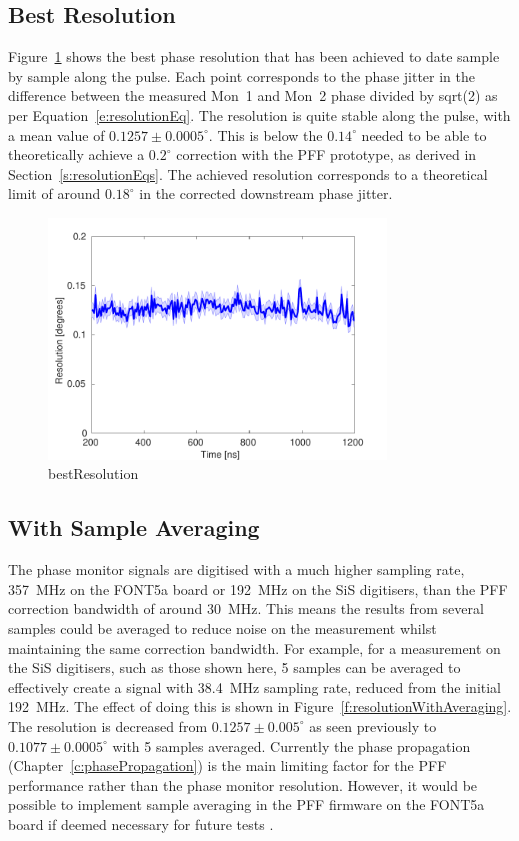 \subsection{Best Resolution}
\label{ss:bestRes}

Figure~\ref{f:bestResolution} shows the best phase resolution that has been achieved to date sample by sample along the pulse. Each point corresponds to the phase jitter in the difference between the measured Mon~1 and Mon~2 phase divided by sqrt(2) as per Equation~\ref{e:resolutionEq}.  The resolution is quite stable along the pulse, with a mean value of \(0.1257\pm0.0005^\circ\). This is below the \(0.14^\circ\) needed to be able to theoretically achieve a \(0.2^\circ\) correction with the PFF prototype, as derived in Section~\ref{s:resolutionEqs}. The achieved resolution corresponds to a theoretical limit of around \(0.18^\circ\) in the corrected downstream phase jitter.

\begin{figure}
  \centering
  \includegraphics[width=0.8\textwidth]{Figures/phaseMons/bestResolution}
  \caption{bestResolution}
  \label{f:bestResolution}
\end{figure}

\subsection{With Sample Averaging}
\label{ss:resCalAlongPulse}

The phase monitor signals are digitised with a much higher sampling rate, 357~MHz on the FONT5a board or 192~MHz on the SiS digitisers, than the PFF correction bandwidth of around 30~MHz. This means the results from several samples could be averaged to reduce noise on the measurement whilst maintaining the same correction bandwidth. For example, for a measurement on the SiS digitisers, such as those shown here, 5 samples can be averaged to effectively create a signal with 38.4~MHz sampling rate, reduced from the initial 192~MHz. The effect of doing this is shown in Figure~\ref{f:resolutionWithAveraging}. The resolution is decreased from \(0.1257\pm0.005^\circ\) as seen previously to \(0.1077\pm0.0005^\circ\) with 5 samples averaged. Currently the phase propagation (Chapter~\ref{c:phasePropagation}) is the main limiting factor for the PFF performance rather than the phase monitor resolution. However, it would be possible to implement sample averaging in the PFF firmware on the FONT5a board if deemed necessary for future tests \cite{glennPriv}.

